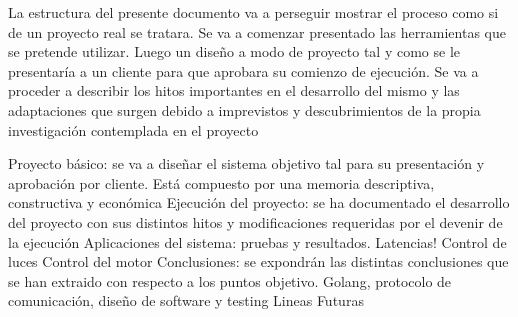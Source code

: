 La estructura del presente documento va a perseguir mostrar el proceso como si de un proyecto real se tratara. Se va a comenzar presentado las herramientas que se pretende utilizar. Luego un diseño a modo de proyecto tal y como se le presentaría a un cliente para que aprobara su comienzo de ejecución. Se va a proceder a describir los hitos importantes en el desarrollo del mismo y las adaptaciones que surgen debido a imprevistos y descubrimientos de la propia investigación contemplada en el proyecto

Proyecto básico: se va a diseñar el sistema objetivo tal para su presentación y aprobación por cliente. Está compuesto por una memoria descriptiva, constructiva y económica
Ejecución del proyecto: se ha documentado el desarrollo del proyecto con sus distintos hitos y modificaciones requeridas por el devenir de la ejecución
Aplicaciones del sistema: pruebas y resultados. 
Latencias!
Control de luces
Control del motor
Conclusiones: se expondrán las distintas conclusiones que se han extraido con respecto a los puntos objetivo. Golang, protocolo de comunicación, diseño de software y testing
Lineas Futuras

